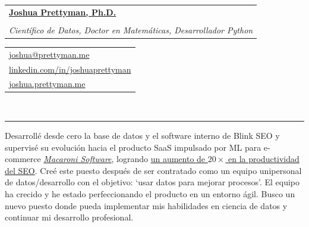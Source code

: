 \documentclass[10pt]{article}
\makeatletter
\newcommand{\makeheading}[8][]{
	\hspace*{-\marginparsep minus \marginparwidth}%
	\begin{minipage}[t]{\textwidth+\marginparwidth+\marginparsep}%
		\begin{tabular}[t]{@{}l}
		{\hspace{-8pt} \Large \bfseries#2}\\
		\\
		{\normalsize \emph{#3}}
		\end{tabular}
		\hfill
		\begin{tabular}[t]{|l}
		#4  \\
		#5  \\
		#6 \\

		\end{tabular}
		\vspace{1pt}
		\\[-0.2\baselineskip]%

		\rule{\columnwidth}{1pt}%
	\end{minipage}
}
\renewcommand{\section}[1]{
	\pagebreak[3]%
	\hyphenpenalty=10000%
	\vspace{\baselineskip}%
	\phantomsection\addcontentsline{toc}{section}{#1}%
	\noindent{\scshape #1}%
	\vspace{\baselineskip}\par
}
\newenvironment{innerlist}[1][\enskip\textbullet]{
	\begin{itemize}[#1,leftmargin=*,parsep=0pt,itemsep=1pt,topsep=2pt,partopsep=0pt]
}{\end{itemize}}
\providecommand*\url[1]{\href{#1}{#1}}
\renewcommand*\url[1]{\href{#1}{\texttt{#1}}}
\providecommand*\email[1]{\href{mailto:#1}{#1}}
\makeatother
\begin{document}
\makeheading{
		\href{https://joshua.prettyman.me/}{Joshua Prettyman, Ph.D.}
}
{Científico de Datos, Doctor en Matemáticas, Desarrollador Python}
{\email{joshua@prettyman.me}}
{\href{https://www.linkedin.com/in/joshuaprettyman/}{linkedin.com/in/joshuaprettyman}}
{\href{https://joshua.prettyman.me/}{joshua.prettyman.me}}







\section{Declaración Personal}

Desarrollé desde cero la base de datos y el software interno de Blink SEO
y supervisé su evolución hacia el producto SaaS impulsado por ML para e-commerce
\href{https://www.macaroni.works}{\textit{Macaroni Software}},
logrando \href{https://blinkseo.co.uk/blogs/case-studies/how-macaroni-made-us-20x-more-productive}{un aumento de $20\times$ en la productividad del SEO}.
Creé este puesto después de ser contratado como un equipo unipersonal de datos/desarrollo con el objetivo:
`usar datos para mejorar procesos'.
El equipo ha crecido y he estado perfeccionando el producto en un entorno ágil.
Busco un nuevo puesto donde pueda implementar mis habilidades en ciencia de datos y
continuar mi desarrollo profesional.


\end{document}
